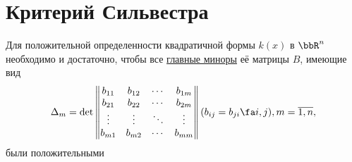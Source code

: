 \section{Критерий Сильвестра}
  \begin{thm} 
  Для положительной определенности квадратичной формы $k(x)$ в $\bbR^n$ необходимо и достаточно, чтобы все \underline{главные миноры} её матрицы $B$, имеющие вид
  \begin{equation}
  \Delta_m=\det \begin{Vmatrix}
  b_{11} & b_{12} & \cdots & b_{1m} \\
  b_{21} & b_{22} & \cdots & b_{2m} \\
  \vdots & \vdots & \ddots & \vdots \\
  b_{m1} & b_{m2} & \cdots & b_{mm} \\
  \end{Vmatrix}(b_{ij}=b_{ji} \fa i,j), m=\overline{1,n},
  \end{equation}
были положительными
  \end{thm}
